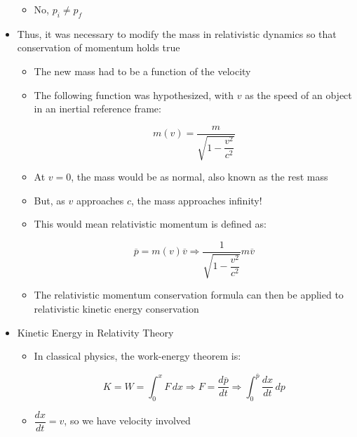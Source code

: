 \begin{itemize}
    \begin{itemize}

      \item No, $p_i \neq p_f$

    \end{itemize}

  \item Thus, it was necessary to modify the mass in relativistic dynamics so that conservation of momentum holds true

    \begin{itemize}

      \item The new mass had to be a function of the velocity

      \item The following function was hypothesized, with $v$ as the speed of an object in an inertial reference frame:

        $$\boxed{m(v)=\frac{m}{\sqrt{1-\dfrac{v^2}{c^2}}}}$$

      \item At $v=0$, the mass would be as normal, also known as the rest mass

      \item But, as $v$ approaches $c$, the mass approaches infinity!

      \item This would mean relativistic momentum is defined as:

        $$\overline{p}=m(v)\overline{v}\Rightarrow \frac{1}{\sqrt{1-\dfrac{v^2}{c^2}}}m\overline{v}$$

      \item The relativistic momentum conservation formula can then be applied to relativistic kinetic energy conservation

    \end{itemize}

  \item Kinetic Energy in Relativity Theory

    \begin{itemize}

      \item In classical physics, the work-energy theorem is:

        $$K=W=\int_0^x F\,dx\Rightarrow F=\frac{d\overline{p}}{dt}\Rightarrow \int_0^{\overline{p}} \frac{dx}{dt}\,dp$$

      \item $\dfrac{dx}{dt}=v$, so we have velocity involved


\end{itemize}
\end{itemize}
